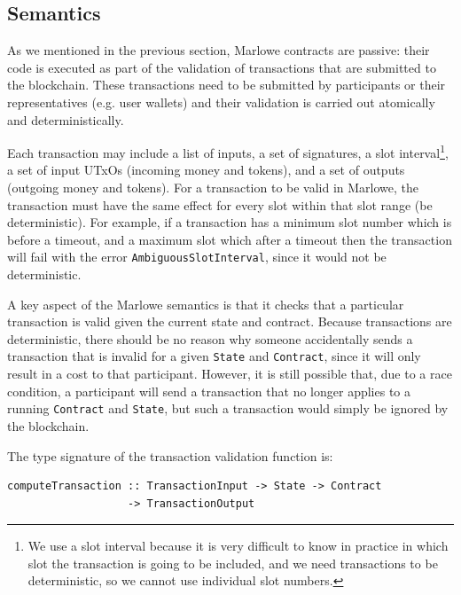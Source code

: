 \documentclass[english,runningheads]{llncs}
\begin{document}
\subsection{Semantics\label{subsec:Marlowe-Semantics}}

As we mentioned in the previous section, Marlowe
contracts are passive: their code is executed as part of the validation of
transactions that are submitted to the blockchain. These transactions
need to be submitted by participants or their representatives (e.g.
user wallets) and their validation is carried out atomically and
deterministically.

Each transaction may include a list of inputs, a set of signatures,
a slot interval\footnote{We use a slot interval because it is very difficult to
know in practice in which slot the transaction is going to be included,
and we need transactions to be deterministic, so we cannot use individual
slot numbers.}, a set of input UTxOs (incoming money and tokens), and a
set of outputs (outgoing money and tokens). For
a transaction to be valid in Marlowe, the transaction must have the
same effect for every slot within that slot range (be deterministic).
For example, if a transaction has a minimum slot number which is before
a timeout, and a maximum slot which after a timeout then the transaction
will fail with the error \texttt{AmbiguousSlotInterval}, since it would
not be deterministic.

A key aspect of the Marlowe semantics is that it checks that a particular
transaction is valid given the current state and contract. Because
transactions are deterministic, there should be no reason why someone
accidentally sends a transaction that is invalid for a given \texttt{State}
and \texttt{Contract}, since it will only result in a cost to that participant.
However, it is still possible that, due to a race condition, a participant will send a
transaction that no longer applies to a running \texttt{Contract} and
\texttt{State}, but such a transaction would simply be ignored by the
blockchain.

The type signature of the transaction validation function is:

\begin{verbatim}
computeTransaction :: TransactionInput -> State -> Contract
                   -> TransactionOutput 
\end{verbatim}
\end{document}
